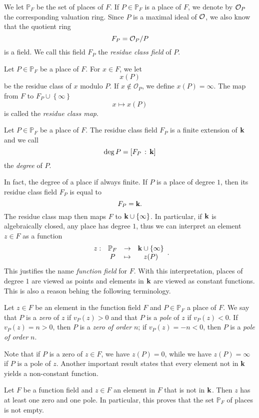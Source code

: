 We let $\mathbb{P}_F$ be the set of places of $F$. If $P\in\mathbb{P}_F$ is a
place of $F$, we denote by $\mathcal{O}_P$ the corresponding valuation ring. Since $P$
is a maximal ideal of $\mathcal{O}$, we also know that the quotient ring
\[
  F_P = \mathcal{O}_P/P
\]
is a field. We call this field $F_P$ the \emph{residue class field} of $P$.
\begin{defi}
Let $P\in\mathbb{P}_F$ be a place of $F$. For $x\in F$, we let 
\[
  x(P)
\]
be the residue class of $x$ modulo $P$. If $x\notin \mathcal O_P$, we define $x(P)=\infty$.
The map from $F$ to $F_P\cup\left\{ \infty \right\}$
\[
  x\mapsto x(P)
\]
is called the \emph{residue class map}.
\end{defi}
\begin{defi}
  Let $P\in\mathbb{P}_F$ be a place of $F$. The residue class field $F_P$ is a
  finite extension of $\mathbf{k}$ and we call
  \[
    \deg P = \left[ F_P\,:\,\mathbf{k} \right]
  \]
  the \emph{degree} of $P$.
\end{defi}
In fact, the degree of a place if always finite. If $P$ is a place of degree
$1$, then its residue class field $F_P$ is equal to
\[
  F_P = \mathbf{k}.
\]
The residue class map then maps $F$ to $\mathbf{k}\cup\left\{ \infty \right\}$. In
particular, if $\mathbf{k}$ is algebraically closed, any place has degree $1$, thus we
can interpret an element $z\in F$ as a function
\[
  \begin{array}{cccc}
    z:&\mathbb{P}_F&\to&\mathbf{k}\cup\left\{ \infty \right\}\\
    & P & \mapsto & z(P)
  \end{array}.
\]
This justifies the name \emph{function field} for $F$. With this interpretation,
places of degree $1$ are viewed as points and elements in $\mathbf{k}$ are viewed as
constant functions. This is also a reason behing the following terminology.
\begin{defi}
  Let $z\in F$ be an element in the function field $F$ and $P\in\mathbb{P}_F$ a
  place of $F$. We say that $P$ is a \emph{zero} of $z$ if $v_P(z)>0$ and that
  $P$ is a \emph{pole} of $z$ if $v_P(z)<0$. If $v_P(z) = n > 0$, then $P$ is a
  \emph{zero of order} $n$; if $v_P(z) = -n < 0$, then $P$ is a \emph{pole of
  order} $n$.
\end{defi}
Note that if $P$ is a zero of $z\in F$, we have $z(P) = 0$, while we have
$z(P)=\infty$ if $P$ is a pole of $z$. Another important result states that
every element not in $\mathbf{k}$ yields a non-constant function.
\begin{prop}
 Let $F$ be a function field and $z\in F$ an element in $F$ that is
 not in $\mathbf{k}$. Then $z$ has at least one zero and one pole. In particular, this
 proves that the set $\mathbb{P}_F$ of places is not empty.
\end{prop}

